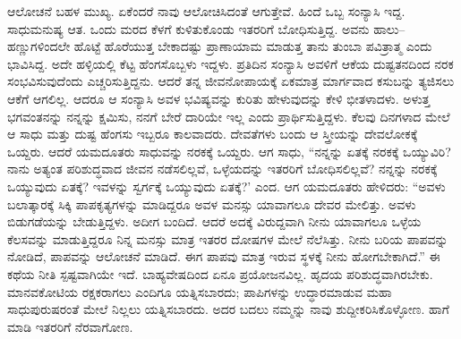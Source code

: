 ಆಲೋಚನೆ ಬಹಳ ಮುಖ್ಯ. ಏಕೆಂದರೆ ನಾವು ಆಲೋಚಿಸಿದಂತೆ ಆಗುತ್ತೇವೆ. ಹಿಂದೆ ಒಬ್ಬ ಸಂನ್ಯಾಸಿ ಇದ್ದ. ಸಾಧುಮನುಷ್ಯ ಆತ. ಒಂದು ಮರದ ಕೆಳಗೆ ಕುಳಿತುಕೊಂಡು ಇತರರಿಗೆ ಬೋಧಿಸುತ್ತಿದ್ದ. ಅವನು ಹಾಲು–ಹಣ್ಣುಗಳಿಂದಲೇ ಹೊಟ್ಟೆ ಹೊರೆಯುತ್ತ ಬೇಕಾದಷ್ಟು ಪ್ರಾಣಾಯಾಮ ಮಾಡುತ್ತ ತಾನು ತುಂಬಾ ಪವಿತ್ರಾತ್ಮ ಎಂದು ಭಾವಿಸಿದ್ದ. ಅದೇ ಹಳ್ಳಿಯಲ್ಲಿ ಕೆಟ್ಟ ಹೆಂಗಸೊಬ್ಬಳು ಇದ್ದಳು. ಪ್ರತಿದಿನ ಸಂನ್ಯಾಸಿ ಅವಳಿಗೆ ಆಕೆಯ ದುಷ್ಟತನದಿಂದ ನರಕ ಸಂಭವಿಸುವುದೆಂದು ಎಚ್ಚರಿಸುತ್ತಿದ್ದನು. ಆದರೆ ತನ್ನ ಜೀವನೋಪಾಯಕ್ಕೆ ಏಕಮಾತ್ರ ಮಾರ್ಗವಾದ ಕಸುಬನ್ನು ತ್ಯಜಿಸಲು ಆಕೆಗೆ ಆಗಲಿಲ್ಲ. ಆದರೂ ಆ ಸಂನ್ಯಾಸಿ ಅವಳ ಭವಿಷ್ಯವನ್ನು ಕುರಿತು ಹೇಳುವುದನ್ನು ಕೇಳಿ ಭೀತಳಾದಳು. ಅಳುತ್ತ ಭಗವಂತನನ್ನು ನನ್ನನ್ನು ಕ್ಷಮಿಸು, ನನಗೆ ಬೇರೆ ದಾರಿಯೇ ಇಲ್ಲ ಎಂದು ಪ್ರಾರ್ಥಿಸುತ್ತಿದ್ದಳು. ಕೆಲವು ದಿನಗಳಾದ ಮೇಲೆ ಆ ಸಾಧು ಮತ್ತು ದುಷ್ಟ ಹೆಂಗಸು ಇಬ್ಬರೂ ಕಾಲವಾದರು. ದೇವತೆಗಳು ಬಂದು ಆ ಸ್ತ್ರೀಯನ್ನು ದೇವಲೋಕಕ್ಕೆ ಒಯ್ದರು. ಆದರೆ ಯಮದೂತರು ಸಾಧುವನ್ನು ನರಕಕ್ಕೆ ಒಯ್ದರು. ಆಗ ಸಾಧು, “ನನ್ನನ್ನು ಏತಕ್ಕೆ ನರಕಕ್ಕೆ ಒಯ್ಯುವಿರಿ? ನಾನು ಅತ್ಯಂತ ಪರಿಶುದ್ಧವಾದ ಜೀವನ ನಡೆಸಲಿಲ್ಲವೆ, ಒಳ್ಳೆಯದನ್ನು ಇತರರಿಗೆ ಬೋಧಿಸಲಿಲ್ಲವೆ? ನನ್ನನ್ನು ನರಕಕ್ಕೆ ಒಯ್ಯುವುದು ಏತಕ್ಕೆ? ಇವಳನ್ನು ಸ್ವರ್ಗಕ್ಕೆ ಒಯ್ಯುವುದು ಏತಕ್ಕೆ?' ಎಂದ. ಆಗ ಯಮದೂತರು ಹೇಳಿದರು: “ಅವಳು ಬಲಾತ್ಕಾರಕ್ಕೆ ಸಿಕ್ಕಿ ಪಾಪಕೃತ್ಯಗಳನ್ನು ಮಾಡಿದ್ದರೂ ಅವಳ ಮನಸ್ಸು ಯಾವಾಗಲೂ ದೇವರ ಮೇಲಿತ್ತು. ಅವಳು ಬಿಡುಗಡೆಯನ್ನು ಬೇಡುತ್ತಿದ್ದಳು. ಅದೀಗ ಬಂದಿದೆ. ಆದರೆ ಅದಕ್ಕೆ ವಿರುದ್ದವಾಗಿ ನೀನು ಯಾವಾಗಲೂ ಒಳ್ಳೆಯ ಕೆಲಸವನ್ನು ಮಾಡುತ್ತಿದ್ದರೂ ನಿನ್ನ ಮನಸ್ಸು ಮಾತ್ರ ಇತರರ ದೋಷಗಳ ಮೇಲೆ ನೆಲೆಸಿತ್ತು. ನೀನು ಬರಿಯ ಪಾಪವನ್ನು ನೋಡಿದೆ, ಪಾಪವನ್ನು ಆಲೋಚನೆ ಮಾಡಿದೆ. ಈಗ ಪಾಪವು ಮಾತ್ರ ಇರುವ ಸ್ಥಳಕ್ಕೆ ನೀನು ಹೋಗಬೇಕಾಗಿದೆ.'' ಈ ಕಥೆಯ ನೀತಿ ಸ್ಪಷ್ಟವಾಗಿಯೇ ಇದೆ. ಬಾಹ್ಯವೇಷದಿಂದ ಏನೂ ಪ್ರಯೋಜನವಿಲ್ಲ. ಹೃದಯ ಪರಿಶುದ್ಧವಾಗಿರಬೇಕು. ಮಾನವಕೋಟಿಯ ರಕ್ಷಕರಾಗಲು ಎಂದಿಗೂ ಯತ್ನಿಸಬಾರದು; ಪಾಪಿಗಳನ್ನು ಉದ್ಧಾರಮಾಡುವ ಮಹಾ ಸಾಧುಪುರುಷರಂತೆ ಮೇಲೆ ನಿಲ್ಲಲು ಯತ್ನಿಸಬಾರದು. ಅದರ ಬದಲು ನಮ್ಮನ್ನು ನಾವು ಶುದ್ದೀಕರಿಸಿಕೊಳ್ಳೋಣ. ಹಾಗೆ ಮಾಡಿ ಇತರರಿಗೆ ನೆರವಾಗೋಣ.

